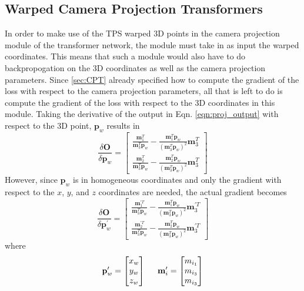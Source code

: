 \documentclass[10pt,twocolumn,letterpaper]{article}
\begin{document}
\subsection{Warped Camera Projection Transformers}
\label{sec:WCPT}
In order to make use of the TPS warped 3D points in the camera projection module of the transformer network, the module must take in as input the warped coordinates. This means that such a module would also have to do backpropogation on the 3D coordinates as well as the camera projection parameters. Since \ref{sec:CPT} already specified how to compute the gradient of the loss with respect to the camera projection parameters, all that is left to do is compute the gradient of the loss with respect to the 3D coordinates in this module.
Taking the derivative of the output in Eqn. \ref{eqn:proj_output} with respect to the 3D point, $\mathbf{p}_w$ results in
\begin{equation}
\frac{\delta \mathbf{O}}{\delta\mathbf{p}_w}=\begin{bmatrix}\frac{\mathbf{m}_1^T}{\mathbf{m}_3^T\mathbf{p}_w}-\frac{\mathbf{m}_1^T\mathbf{p}_w}{\left(\mathbf{m}_3^T\mathbf{p}_w\right)^2}\mathbf{m}_3^T\\
\frac{\mathbf{m}_2^T}{\mathbf{m}_3^T\mathbf{p}_w}-\frac{\mathbf{m}_2^T\mathbf{p}_w}{\left(\mathbf{m}_3^T\mathbf{p}_w\right)^2}\mathbf{m}_3^T\end{bmatrix}
\end{equation}
However, since $\mathbf{p}_w$ is in homogeneous coordinates and only the gradient with respect to the $x$, $y$, and $z$ coordinates are needed, the actual gradient becomes
\begin{equation}
\frac{\delta \mathbf{O}}{\delta\mathbf{p}_w^\prime}=\begin{bmatrix}\frac{\mathbf{m}_1^{\prime T}}{\mathbf{m}_3^T\mathbf{p}_w}-\frac{\mathbf{m}_1^T\mathbf{p}_w}{\left(\mathbf{m}_3^T\mathbf{p}_w\right)^2}\mathbf{m}_3^{\prime T}\\
\frac{\mathbf{m}_2^{\prime T}}{\mathbf{m}_3^T\mathbf{p}_w}-\frac{\mathbf{m}_2^T\mathbf{p}_w}{\left(\mathbf{m}_3^T\mathbf{p}_w\right)^2}\mathbf{m}_3^{\prime T}\end{bmatrix}
\end{equation}
where
\begin{equation}
\mathbf{p}_w^\prime=\begin{bmatrix}x_w\\y_w\\z_w\end{bmatrix} \hspace{.2in} \mathbf{m}_i^\prime=\begin{bmatrix}m_{i_1}\\m_{i_3}\\m_{i_3}\end{bmatrix}
\end{equation}
\end{document}
